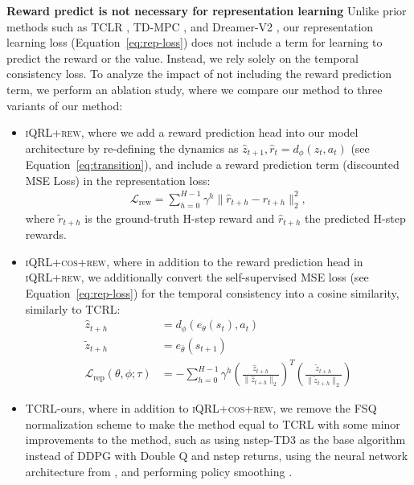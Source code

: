 \documentclass{article}
\theoremstyle{plain}
\theoremstyle{definition}
\theoremstyle{remark}
\newcommand{\ourrew}{\textsc{iQRL+rew}\xspace}
\newcommand{\ourcosrew}{\textsc{iQRL+cos+rew}\xspace}
\begin{document}
\textbf{Reward predict is not necessary for representation learning}
Unlike prior methods such as TCLR \cite{zhaoSimplifiedTemporalConsistency2023}, TD-MPC \cite{hansenTemporalDifferenceLearning2022}, and Dreamer-V2 \cite{hafnerMasteringAtariDiscrete2022}, our representation learning loss (Equation~\ref{eq:rep-loss}) does not include a term for learning to predict the reward or the value. Instead, we rely solely on the temporal consistency loss. To analyze the impact of not including the reward prediction term, we perform an ablation study, where we compare our method to three variants of our method:
\begin{itemize}
	\item \ourrew, where we add a reward prediction head into our model architecture by re-defining the dynamics as $\hat{z}_{t+1}, \hat{r}_t = d_{\phi} (z_{t}, a_{t})$ (see Equation~\ref{eq:transition}), and include a reward prediction term (discounted MSE Loss) in the representation loss:
	\begin{align*}
		\mathcal{L}_\text{rew} = \sum_{h=0}^{H-1} \gamma^h \| \hat{r}_{t+h} - r_{t+h}\|_2^2,
	\end{align*}
	where $\tilde{r}_{t+h}$ is the ground-truth H-step reward and $\hat{r}_{t+h}$ the predicted H-step rewards.
	\item \ourcosrew, where in addition to the reward prediction head in \ourrew, we additionally convert the self-supervised MSE loss (see Equation~\ref{eq:rep-loss}) for the temporal consistency into a cosine similarity, similarly to TCRL:
	\begin{align*} \label{eq:rep-loss}
		\hat{z}_{t+h} &= d_{\phi}(e_{\theta}(s_{t}), a_{t}) \\
		\tilde{z}_{t+h} &= e_{\bar{\theta}}(s_{t+1}) \\
		\mathcal{L}_{\text{rep}}(\theta, \phi; \tau)
		&= - \sum_{h=0}^{H-1} \gamma^{h} \left ( \frac{\hat{z}_{t+h}}{\| \hat{z}_{t+h} \|_2} \right )^T \left ( \frac{\tilde{z}_{t+h}}{\| \tilde{z}_{t+h} \|_2} \right )
	\end{align*}
	\item TCRL-ours, where in addition to \ourcosrew, we remove the FSQ normalization scheme to make the method equal to TCRL with some minor improvements to the method, such as using nstep-TD3 \cite{fujimotoAddressingFunctionApproximation2018} as the base algorithm instead of DDPG with Double Q and nstep returns, using the neural network architecture from \citet{hansen2023td}, and performing policy smoothing \cite{fujimotoAddressingFunctionApproximation2018}.
\end{itemize}
\end{document}
